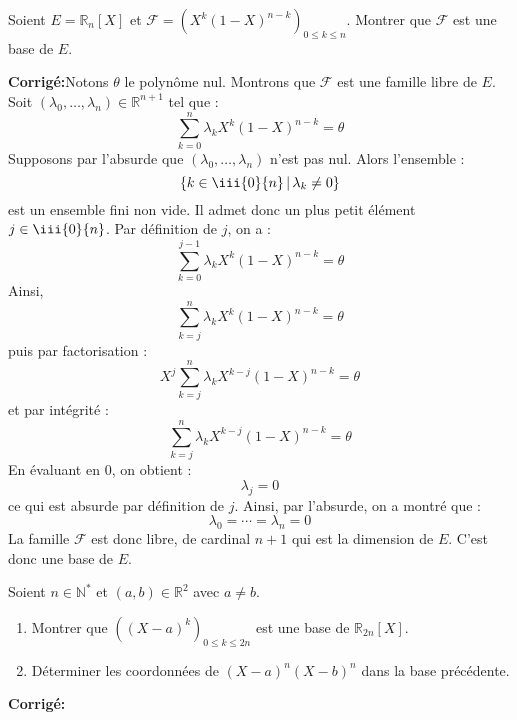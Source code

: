 \documentclass[a4paper,twoside,french,10pt]{VcCours}
\newcommand{\corr}{\textbf{Corrigé:}}
\begin{document}
\medskip

\begin{Exercice}{} Soient $E= \mathbb{R}_n[X]$ et $\mathcal{F} = (X^k(1-X)^{n-k})_{0 \leq k \leq n}$. Montrer que $\mathcal{F}$ est une base de $E$.
\end{Exercice}

\corr Notons $\theta$ le polynôme nul. Montrons que $\mathcal{F}$ est une famille libre de $E$. Soit $(\lambda_0, \ldots, \lambda_n) \in \mathbb{R}^{n+1}$ tel que :
$$ \sum_{k=0}^n \lambda_k X^k (1-X)^{n-k} = \theta$$
Supposons par l'absurde que $(\lambda_0, \ldots, \lambda_n)$ n'est pas nul. Alors l'ensemble :
$$ \lbrace k \in \iii{0}{n} \, \vert \, \lambda_k \neq 0 \rbrace$$
est un ensemble fini non vide. Il admet donc un plus petit élément $j \in \iii{0}{n}$. Par définition de $j$, on a :
$$ \sum_{k=0}^{j-1} \lambda_k X^k (1-X)^{n-k} = \theta$$
Ainsi,
$$ \sum_{k=j}^n \lambda_k X^k (1-X)^{n-k} = \theta$$
puis par factorisation :
$$ X^j \sum_{k=j}^n \lambda_k X^{k-j} (1-X)^{n-k} = \theta$$
et par intégrité :
$$ \sum_{k=j}^n \lambda_k X^{k-j} (1-X)^{n-k} = \theta$$
En évaluant en $0$, on obtient :
$$ \lambda_j = 0$$
ce qui est absurde par définition de $j$. Ainsi, par l'absurde, on a montré que :
$$ \lambda_0 = \cdots = \lambda_n = 0$$
La famille $\mathcal{F}$ est donc libre, de cardinal $n+1$ qui est la dimension de $E$. C'est donc une base de $E$.

\medskip


\begin{Exercice}{} Soient $n \in \mathbb{N}^*$ et $(a,b) \in \mathbb{R}^2$ avec $a \neq b$.
\begin{enumerate}
\item Montrer que $((X-a)^k)_{0 \leq k \leq 2n}$ est une base de $\mathbb{R}_{2n}[X]$.
\item Déterminer les coordonnées de $(X-a)^n(X-b)^n$ dans la base précédente.
\end{enumerate}
\end{Exercice} 

\corr 
\end{document}
